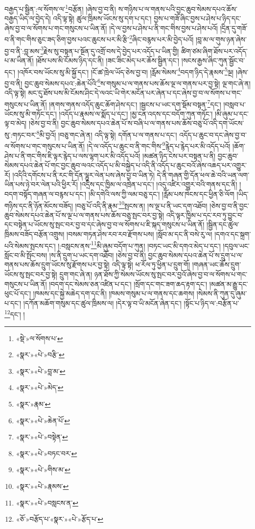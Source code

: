 བརྒྱད་པ་སྦྱིན་:ལ་སོགས་ལ་\footnote{«སྡེ་»ལ་སོགས་པ་}བརྩོན། །ཞེས་བྱ་བ་ནི། ས་གཉིས་པ་ལ་གནས་པའི་བྱང་ཆུབ་སེམས་དཔའ་ཆོས་བརྒྱད་ཡིད་ལ་བྱེད་དེ། འདི་ལྟ་སྟེ། ཚུལ་ཁྲིམས་ཡོངས་སུ་དག་པ་དང་། བྱས་པ་གཟོ་ཞིང་བྱས་པ་ཤེས་པ་ཉིད་དང་ཞེས་བྱ་བ་ལ་སོགས་པ་གང་གསུངས་པ་ཡིན་ནོ། །དེ་ལ་བྱས་པ་ཤེས་པ་ནི་གང་གིས་བྱས་པ་ཤེས་པའོ། །དྲིན་དུ་གཟོ་བ་ནི་གང་གིས་ཅུང་ཟད་ཅིག་བྱས་པའང་ཆུངས་པར་མི་རྩི་\footnote{«སྣར་»«པེ་»བརྩི་}ཞིང་བརྙས་པར་མི་བྱེད་པའོ། །བླ་མ་ལ་གུས་ཉན་ཞེས་བྱ་བ་ནི་:བླ་མས་\footnote{«སྣར་»«པེ་»བླ་མ་}རྗེས་སུ་བསྟན་པ་སྔོན་དུ་འགྲོ་བས་དེ་བྱེད་པར་འདོད་པ་ཡིན་གྱི། ཚིག་ཙམ་ཞིག་ཐོས་པར་འདོད་པ་མ་ཡིན་ནོ། །ཐོས་པས་མི་ངོམས་ཉིད་དང་ནི། །ཟང་ཟིང་མེད་པར་ཆོས་སྦྱིན་དང་། །སངས་རྒྱས་ཞིང་ཀུན་སྦྱོང་བ་དང་། །འཁོར་བས་ཡོངས་སུ་མི་སྐྱོ་དང་། །ངོ་ཚ་ཁྲེལ་ཡོད་ཅེས་བྱ་བ། །རློམ་སེམས་\footnote{«སྣར་»«པེ་»མེད་}བདག་ཉིད་དེ་རྣམས་\footnote{«སྣར་»རྣམ་}ལྔ། །ཞེས་བྱ་བ་ནི། བྱང་ཆུབ་སེམས་དཔའ་:ཆེན་པོའི་\footnote{«སྣར་»«པེ་»ཆེན་པོ་}ས་གསུམ་པ་ལ་གནས་པས་ཆོས་ལྔ་ལ་གནས་པར་བྱ་སྟེ། ལྔ་གང་ཞེ་ན། འདི་ལྟ་སྟེ། མང་དུ་ཐོས་པས་མི་ངོམས་ཤིང་དེ་ལའང་ཡི་གེར་མངོན་པར་ཞེན་པ་དང་ཞེས་བྱ་བ་ལ་སོགས་པ་གང་གསུངས་པ་ཡིན་ནོ། །ནགས་གནས་འདོད་ཆུང་ཆོག་ཤེས་དང་། །སྦྱངས་པ་ཡང་དག་སྡོམ་བསྟན་\footnote{«སྣར་»«པེ་»བསྟེན་}དང་། །བསླབ་པ་ཡོངས་སུ་མི་གཏོང་དང་། །འདོད་པ་རྣམས་ལ་སྨོད་པ་དང་། །མྱ་ངན་འདས་དང་བདོག་ཀུན་གཏོང་། །མི་ཞུམ་པ་དང་ལྟ་བ་མེད། །ཅེས་བྱ་བ་ནི། བྱང་ཆུབ་སེམས་དཔའ་ཆེན་པོ་ས་བཞི་པ་ལ་གནས་པས་ཆོས་བཅུ་པོ་འདི་དག་ཡོངས་སུ་:གཏང་བར་\footnote{«སྣར་»«པེ་»བཏང་བར་}མི་བྱའོ། །བཅུ་གང་ཞེ་ན། འདི་ལྟ་སྟེ། དགོན་པ་ལ་གནས་པ་དང་། འདོད་པ་ཆུང་བ་དང་ཞེས་བྱ་བ་ལ་སོགས་པ་གང་གསུངས་པ་ཡིན་ནོ། །དེ་ལ་འདོད་པ་ཆུང་བ་ནི་གང་གིས་\footnote{«སྣར་»«པེ་»གིས་མ་}རྙེད་པ་རྙེད་པར་མི་འདོད་པའོ། །ཆོག་ཤེས་པ་ནི་གང་གིས་ཇི་ལྟར་རྙེད་པ་ལས་ལྷག་པར་མི་འདོད་པའོ། །མཚན་ཉིད་ངེས་པར་བསྟན་པ་ནི། བྱང་ཆུབ་སེམས་དཔའ་ཆེན་པོ་གང་བྱང་ཆུབ་ལའང་འདོད་པ་མི་བསྐྱེད་པ་འདི་ནི་འདོད་པ་ཆུང་བའོ་ཞེས་འཆད་པར་འགྱུར་རོ། །འདིའི་དགོངས་པ་ནི་རང་གི་དོན་ལྷུར་ལེན་པས་ཞེས་བྱ་བ་ཡིན་ཏེ། དེ་ནི་གཞན་གྱི་དོན་ཕལ་ཆེ་བའི་ཡན་ལག་ཡིན་པས་ཉེ་བར་ལེན་པའི་ཕྱིར་རོ། །འདྲིས་དང་ཁྱིམ་ལ་འཁྲེན་པ་དང་། །འདུ་འཛིར་འགྱུར་བའི་གནས་དང་ནི། །བདག་བསྟོད་གཞན་ལ་བརྙས་པ་དང་། །མི་དགེའི་ལས་ཀྱི་ལམ་བཅུ་དང་། །རློམ་པས་ཁེངས་དང་ཕྱིན་ཅི་ལོག །ཡིད་གཉིས་དང་ནི་ཉོན་མོངས་བཟོད། །བཅུ་པོ་འདི་ནི་རྣམ་\footnote{«སྣར་»«པེ་»རྣམས་}སྤངས་ན། །ས་ལྔ་པ་ནི་ཡང་དག་འཐོབ། །ཅེས་བྱ་བ་ནི་བྱང་ཆུབ་སེམས་དཔའ་ཆེན་པོ་ས་ལྔ་པ་ལ་གནས་པས་ཆོས་བཅུ་སྤང་བར་བྱ་སྟེ། འདི་ལྟར་ཁྱིམ་པ་དང་རབ་ཏུ་བྱུང་བ་དང་བསྟེན་པ་ཡོངས་སུ་སྤང་བར་བྱ་བ་དང་ཞེས་བྱ་བ་ལ་སོགས་པ་ཇི་སྐད་གསུངས་པ་ཡིན་ནོ། །སྦྱིན་དང་ཚུལ་ཁྲིམས་བཟོད་བརྩོན་འགྲུས། །བསམ་གཏན་ཤེས་རབ་རབ་རྫོགས་པས། །སློབ་མ་དང་ནི་བསེ་རུ་ལ། །དགའ་དང་སྐྲག་པའི་སེམས་སྤངས་དང་། །:བསླངས་ནས་\footnote{«སྣར་»«པེ་»བསླངས་ན་}མི་ཞུམ་བདོག་པ་ཀུན། །བཏང་ཡང་མི་དགའ་མེད་པ་དང་། །དབུལ་ཡང་སློང་བ་མི་སྤོང་བས། །ས་ནི་དྲུག་པ་ཡང་དག་འཐོབ། །ཅེས་བྱ་བ་ནི། བྱང་ཆུབ་སེམས་དཔའ་ཆེན་པོ་ས་དྲུག་པ་ལ་གནས་པས་ཆོས་དྲུག་ཡོངས་སུ་རྫོགས་པར་བྱ་སྟེ། འདི་ལྟ་སྟེ། ཕ་རོལ་ཏུ་ཕྱིན་པ་དྲུག་གོ། །གཞན་ཡང་ཆོས་དྲུག་ཡོངས་སུ་སྤང་བར་བྱ་སྟེ། དྲུག་གང་ཞེ་ན། ཉན་ཐོས་ཀྱི་སེམས་ཡོངས་སུ་སྤང་བར་བྱའོ་ཞེས་བྱ་བ་ལ་སོགས་པ་གང་གསུངས་པ་ཡིན་ནོ། །བདག་དང་སེམས་ཅན་འཛིན་པ་དང་། །སྲོག་དང་གང་ཟག་ཆད་རྟག་དང་། །མཚན་མ་རྒྱུ་དང་ཕུང་པོ་དང་། །ཁམས་དང་སྐྱེ་མཆེད་དག་དང་ནི། །ཁམས་གསུམ་པ་ལ་གནས་དང་ཆགས། །སེམས་ནི་ཀུན་དུ་ཞུམ་པ་དང་། །དཀོན་མཆོག་གསུམ་དང་ཚུལ་ཁྲིམས་ལ། །དེར་ལྟ་བ་ཡི་མངོན་ཞེན་དང་། །སྟོང་པ་ཉིད་ལ་:བརྩོན་པ་\footnote{«ཅོ་»བརྩོད་པ་«སྣར་»«པེ་»རྩོད་པ་}དང་། །
